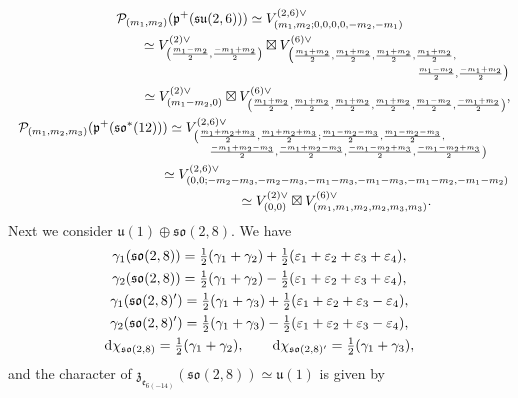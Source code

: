 \documentclass[pdftex]{sigma}
\numberwithin{equation}{section}
\newcommand{\fp}{\mathfrak{p}}
\newcommand{\fz}{\mathfrak{z}}
\newcommand{\cP}{\mathcal{P}}
\newcommand{\ve}{\varepsilon}
\begin{document}
\begin{gather*}
\cP_{(m_1,m_2)}(\fp^+(\mathfrak{su}(2,6))) \simeq V_{(m_1,m_2;0,0,0,0,-m_2,-m_1)}^{(2,6)\vee}\\
\hphantom{\cP_{(m_1,m_2)}(\fp^+(\mathfrak{su}(2,6)))}{} \simeq V_{\left(\frac{m_1-m_2}{2},\frac{-m_1+m_2}{2}\right)}^{(2)\vee}\boxtimes
V_{\substack{\bigl(\frac{m_1+m_2}{2},\frac{m_1+m_2}{2},\frac{m_1+m_2}{2},\frac{m_1+m_2}{2},\hspace{40pt}\\
\hspace{95pt}\frac{m_1-m_2}{2},\frac{-m_1+m_2}{2}\bigr)}}^{(6)\vee}\\
\hphantom{\cP_{(m_1,m_2)}(\fp^+(\mathfrak{su}(2,6)))}{} \simeq V_{(m_1-m_2,0)}^{(2)\vee}\boxtimes
V_{\left(\frac{m_1+m_2}{2},\frac{m_1+m_2}{2},\frac{m_1+m_2}{2},\frac{m_1+m_2}{2},\frac{m_1-m_2}{2},\frac{-m_1+m_2}{2}\right)}^{(6)\vee},\\
\cP_{(m_1,m_2,m_3)}(\fp^+(\mathfrak{so}^*(12))) \simeq
V_{\substack{\left(\frac{m_1+m_2+m_3}{2},\frac{m_1+m_2+m_3}{2};\frac{m_1-m_2-m_3}{2},\frac{m_1-m_2-m_3}{2},\right.\qquad\qquad \\
\left.\frac{-m_1+m_2-m_3}{2},\frac{-m_1+m_2-m_3}{2},\frac{-m_1-m_2+m_3}{2},\frac{-m_1-m_2+m_3}{2}\right)}}^{(2,6)\vee}\\
\hphantom{\cP_{(m_1,m_2,m_3)}(\fp^+(\mathfrak{so}^*(12)))}{} \simeq V_{(0,0;-m_2-m_3,-m_2-m_3,-m_1-m_3,-m_1-m_3,-m_1-m_2,-m_1-m_2)}^{(2,6)\vee}\\
\hphantom{\cP_{(m_1,m_2,m_3)}(\fp^+(\mathfrak{so}^*(12)))}{}\simeq V_{(0,0)}^{(2)\vee}\boxtimes V_{(m_1,m_1,m_2,m_2,m_3,m_3)}^{(6)\vee}.
\end{gather*}
Next we consider $\mathfrak{u}(1)\oplus\mathfrak{so}(2,8)$. We have
\begin{gather*}
\gamma_1(\mathfrak{so}(2,8))=\tfrac12 (\gamma_1+\gamma_2)+\tfrac{1}{2}(\ve_1+\ve_2+\ve_3+\ve_4),\\
\gamma_2(\mathfrak{so}(2,8))=\tfrac12 (\gamma_1+\gamma_2) -\tfrac{1}{2}(\ve_1+\ve_2+\ve_3+\ve_4),\\
\gamma_1(\mathfrak{so}(2,8)')=\tfrac12 (\gamma_1+\gamma_3)+\tfrac{1}{2}(\ve_1+\ve_2+\ve_3-\ve_4),\\
\gamma_2(\mathfrak{so}(2,8)')=\tfrac12 (\gamma_1+\gamma_3)-\tfrac{1}{2}(\ve_1+\ve_2+\ve_3-\ve_4),\\
{\rm d}\chi_{\mathfrak{so}(2,8)}=\tfrac12 (\gamma_1+\gamma_2),\qquad {\rm d}\chi_{\mathfrak{so}(2,8)'}=\tfrac12 (\gamma_1+\gamma_3),
\end{gather*}
and the character of $\fz_{\mathfrak{e}_{6(-14)}}(\mathfrak{so}(2,8))\simeq\mathfrak{u}(1)$ is given by
\end{document}
